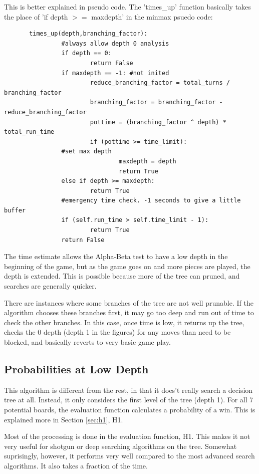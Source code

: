 \documentclass[12pt]{article}
\begin{document}
\pagebreak

This is better explained in pseudo code. The 'times\_up' function basically takes the place of 'if depth $>=$ maxdepth' in the minmax psuedo code:

\scriptsize
\begin{lstlisting}
       times_up(depth,branching_factor):
                #always allow depth 0 analysis
                if depth == 0:
                        return False
                if maxdepth == -1: #not inited
                        reduce_branching_factor = total_turns / branching_factor
                        branching_factor = branching_factor - reduce_branching_factor
                        pottime = (branching_factor ^ depth) * total_run_time
                        if (pottime >= time_limit): 
				#set max depth
                                maxdepth = depth
                                return True
                else if depth >= maxdepth:
                        return True
                #emergency time check. -1 seconds to give a little buffer
                if (self.run_time > self.time_limit - 1):
                        return True
                return False
\end{lstlisting}
\normalsize

The time estimate allows the Alpha-Beta test to have a low depth in the beginning of the game, but as the 
game goes on and more pieces are played, the depth is extended. This is possible because more of the tree
can pruned, and searches are generally quicker.

There are instances where some branches of the tree are not well prunable. If the algorithm chooses these
branches first, it may go too deep and run out of time to check the other branches. In this case, once time is low, it returns up the tree, checks the 0 depth (depth 1 in the figures) for any moves than need to be blocked,
and basically reverts to very basic game play. 


\subsection{Probabilities at Low Depth}
\label{sec:prob_lowd}
This algorithm is different from the rest, in that it does't really search a decision tree at all. Instead, it only
considers the first level of the tree (depth 1). For all 7 potential boards, the evaluation function calculates a
probability of a win. This is explained more in Section \ref{sec:h1}, H1.

Most of the processing is done in the evaluation function, H1. This makes it not very useful for shotgun or
deep searching algorithms on the tree. Somewhat suprisingly, however, it performs very well compared to 
the most advanced search algorithms. It also takes a fraction of the time.
\end{document}
